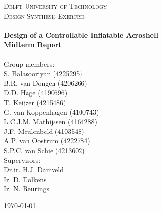 \begin{titlepage}
\begin{center}

\textsc{\LARGE Delft University of Technology}\\[0.3cm]
\textsc{\Large Design Synthesis Exercise}\\[0.5cm]

\HRule \\[0.4cm]
{\Large \bfseries Design of a Controllable Inflatable Aeroshell}\\[0.2cm]
{\Huge \bfseries Midterm Report}\\[0.2cm]
\HRule \\[9cm]


Group members: \\[0.2cm]
S. Balasooriyan (4225295) \\
B.R. van Dongen (4206266) \\
D.D. Hage (4190696) \\
T. Keijzer (4215486) \\
G. van Koppenhagen (4100743) \\
L.C.J.M. Mathijssen (4164288) \\
J.F. Meulenbeld (4103548) \\
A.P. van Oostrum (4222784) \\
S.P.C. van Schie (4213602) \\[0.5cm]

Supervisors: \\[0.2cm]
Dr.ir. H.J. Damveld \\
Ir. D. Dolkens \\
Ir. N. Reurings \\



\vfill

\begin{large}\today \end{large}

\end{center}
\end{titlepage}